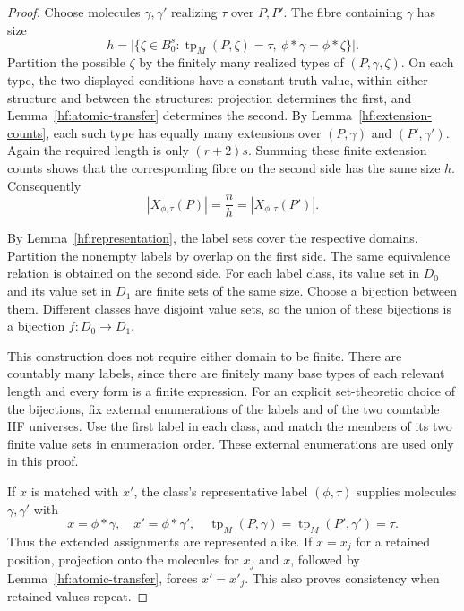 \begin{proof}
Choose molecules $\gamma,\gamma'$ realizing $\tau$ over $P,P'$.
The fibre containing $\gamma$ has size
\[
 h=
 \bigl|\{\zeta\in B_0^s:
       \operatorname{tp}_M(P,\zeta)=\tau,\
       \phi*\gamma=\phi*\zeta\}\bigr|.
\]
Partition the possible $\zeta$ by the finitely many realized types of
$(P,\gamma,\zeta)$.
On each type, the two displayed conditions have a constant truth
value, within either structure and between the structures:
projection determines the first, and
Lemma~\ref{hf:atomic-transfer} determines the second.
By Lemma~\ref{hf:extension-counts}, each such type has equally many
extensions over $(P,\gamma)$ and $(P',\gamma')$.
Again the required length is only $(r+2)s$.
Summing these finite extension counts shows that the corresponding
fibre on the second side has the same size $h$.
Consequently
\[
                    |X_{\phi,\tau}(P)|
                     =\frac{n}{h}
                     =|X_{\phi,\tau}(P')|.
\]

By Lemma~\ref{hf:representation}, the label sets cover the respective
domains.  Partition the nonempty labels by overlap on the first side.
The same equivalence relation is obtained on the second side.
For each label class, its value set in $D_0$ and its value set in $D_1$
are finite sets of the same size.  Choose a bijection between them.
Different classes have disjoint value sets, so the union of these
bijections is a bijection $f:D_0\to D_1$.

This construction does not require either domain to be finite.
There are countably many labels, since there are finitely many base
types of each relevant length and every form is a finite expression.
For an explicit set-theoretic choice of the bijections, fix external
enumerations of the labels and of the two countable HF universes.
Use the first label in each class, and match the members of its two
finite value sets in enumeration order.
These external enumerations are used only in this proof.

If $x$ is matched with $x'$, the class's representative label
$(\phi,\tau)$ supplies molecules $\gamma,\gamma'$ with
\[
 x=\phi*\gamma,\quad x'=\phi*\gamma',\quad
 \operatorname{tp}_M(P,\gamma)
       =\operatorname{tp}_M(P',\gamma')=\tau .
\]
Thus the extended assignments are represented alike.
If $x=x_j$ for a retained position, projection onto the molecules for
$x_j$ and $x$, followed by Lemma~\ref{hf:atomic-transfer}, forces
$x'=x'_j$.  This also proves consistency when retained values repeat.
\end{proof}

